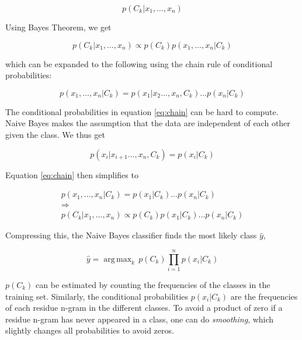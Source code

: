 \documentclass[10pt,letterpaper]{article}
\DeclareMathOperator*{\argmax}{arg\,max}
\begin{document}
	\begin{equation}
	p(C_k|x_1, \dots ,x_n)
	\end{equation}
	
	\noindent Using Bayes Theorem, we get
	
	\begin{equation}
	p(C_k|x_1,\dots,x_n) \propto p(C_k) p(x_1,\dots,x_n|C_k)
	\end{equation}
	
	\noindent which can be expanded to the following using the chain rule of conditional probabilities: 
	
	\begin{equation}
	\label{eq:chain}
	p(x_1,\dots,x_n|C_k) = p(x_1|x_2\dots,x_n,C_k) \dots p(x_n|C_k)
	\end{equation}
	
	\noindent The conditional probabilities in equation \ref{eq:chain} can be hard to compute. Naive Bayes makes the assumption that the data are independent of each other given the class. We thus get
	
	\begin{equation}
	p(x_i|x_{i+1}\dots,x_n,C_k) = p(x_i|C_k)
	\end{equation}
	
	\noindent Equation \ref{eq:chain} then simplifies to
	
	\begin{equation}
	\begin{gathered}
	p(x_1,\dots,x_n|C_k) = p(x_1|C_k) \dots p(x_n|C_k) \\
	\Rightarrow \\
	p(C_k|x_1,\dots,x_n) \propto p(C_k) p(x_1|C_k) \dots p(x_n|C_k)
	\end{gathered}
	\end{equation}
	
	\noindent Compressing this, the Naive Bayes classifier finds the most likely class $\hat{y}$,
	
	\begin{equation}
	\hat{y} = \argmax_{k} \, p(C_k) \prod_{i=1}^{n} p(x_i|C_k)    
	\end{equation}
	
	\noindent $p(C_k)$ can be estimated by counting the frequencies of the classes in the training set. Similarly, the conditional probabilities $p(x_i|C_k)$ are the frequencies of each residue n-gram in the different classes. To avoid a product of zero if a residue n-gram has never appeared in a class, one can do \textit{smoothing}, which slightly changes all probabilities to avoid zeros. 
	
\end{document}
